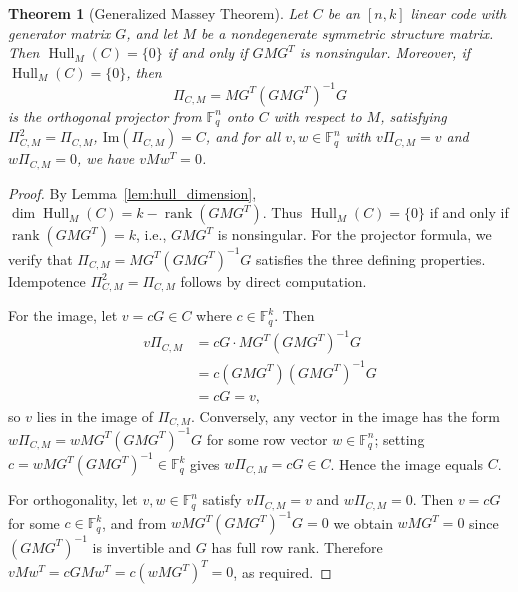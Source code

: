 \documentclass[10pt,a4paper]{amsart}
\newtheorem{theorem}{Theorem}
\newcommand{\FF}{\mathbb{F}}
\DeclareMathOperator{\Hull}{Hull}
\DeclareMathOperator{\rank}{rank}
\begin{document}
\begin{theorem}[Generalized Massey Theorem]
\label{thm:generalized_massey}
Let $C$ be an $[n,k]$ linear code with generator matrix $G$, and let $M$ be a nondegenerate symmetric structure matrix. Then $\Hull_M(C) = \{0\}$ if and only if $GMG^T$ is nonsingular. Moreover, if $\Hull_M(C) = \{0\}$, then
$$\Pi_{C,M} = MG^T(GMG^T)^{-1}G$$
is the orthogonal projector from $\FF_q^n$ onto $C$ with respect to $M$, satisfying $\Pi_{C,M}^2 = \Pi_{C,M}$, $\text{Im}(\Pi_{C,M}) = C$, and for all $v, w \in \FF_q^n$ with $v\Pi_{C,M} = v$ and $w\Pi_{C,M} = 0$, we have $vMw^T = 0$.
\end{theorem}

\begin{proof}
By Lemma~\ref{lem:hull_dimension}, $\dim \Hull_M(C) = k - \rank(GMG^T)$. Thus $\Hull_M(C) = \{0\}$ if and only if $\rank(GMG^T) = k$, i.e., $GMG^T$ is nonsingular.
For the projector formula, we verify that $\Pi_{C,M} = MG^T(GMG^T)^{-1}G$ satisfies the three defining properties. Idempotence $\Pi_{C,M}^2 = \Pi_{C,M}$ follows by direct computation.

For the image, let $v = cG \in C$ where $c \in \mathbb{F}_q^k$.
Then
\begin{align*}
v\Pi_{C,M}
&= cG \cdot MG^T(GMG^T)^{-1}G\\
&= c(GMG^T)(GMG^T)^{-1}G\\
&= cG = v,
\end{align*}
so $v$ lies in the image of $\Pi_{C,M}$. Conversely, any vector in the image has the form $w\Pi_{C,M} = wMG^T(GMG^T)^{-1}G$ for some row vector $w \in \mathbb{F}_q^n$; setting $c = wMG^T(GMG^T)^{-1} \in \mathbb{F}_q^k$ gives $w\Pi_{C,M} = cG \in C$. Hence the image equals $C$.

For orthogonality, let $v, w \in \mathbb{F}_q^n$ satisfy $v\Pi_{C,M} = v$ and $w\Pi_{C,M} = 0$. Then $v = cG$ for some $c \in \mathbb{F}_q^k$, and from $wMG^T(GMG^T)^{-1}G = 0$ we obtain $wMG^T = 0$ since $(GMG^T)^{-1}$ is invertible and $G$ has full row rank. Therefore $vMw^T = cGMw^T = c(wMG^T)^T = 0$, as required.
\end{proof}
\end{document}
